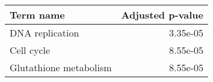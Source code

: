 \begin{tabular}{lr}
\toprule
             Term name &  Adjusted p-value \\
\midrule
       DNA replication &          3.35e-05 \\
            Cell cycle &          8.55e-05 \\
Glutathione metabolism &          8.55e-05 \\
\bottomrule
\end{tabular}
